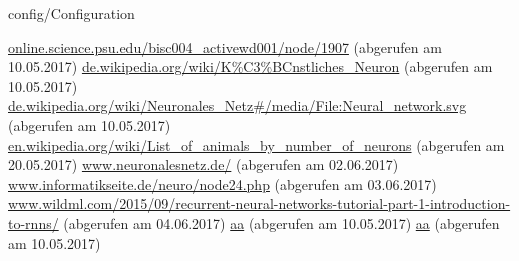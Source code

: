 \documentclass[12pt,headsepline,oneside,ngerman]{scrreprt}
\begin{document}
\graphicspath{{figures/}}

 {config/Configuration}
\pagestyle{headings}






%
%
%
%
%
%


%

\cleardoublepage
\begin{thebibliography}{xxxx}
\url{online.science.psu.edu/bisc004_activewd001/node/1907} (abgerufen am 10.05.2017)
\url{de.wikipedia.org/wiki/K%C3%BCnstliches_Neuron} (abgerufen am 10.05.2017)
\url{de.wikipedia.org/wiki/Neuronales_Netz#/media/File:Neural_network.svg} (abgerufen am 10.05.2017)
\url{en.wikipedia.org/wiki/List_of_animals_by_number_of_neurons} (abgerufen am 20.05.2017)
\url{www.neuronalesnetz.de/} (abgerufen am 02.06.2017)
\url{www.informatikseite.de/neuro/node24.php} (abgerufen am 03.06.2017)
\url{www.wildml.com/2015/09/recurrent-neural-networks-tutorial-part-1-introduction-to-rnns/} (abgerufen am 04.06.2017)
\url{aa} (abgerufen am 10.05.2017)
\url{aa} (abgerufen am 10.05.2017)


\end{thebibliography}
\renewcommand{\bibname}{Literaturverzeichnis}

%

\cleardoublepage
{}
\listoffigures
\end{document}
